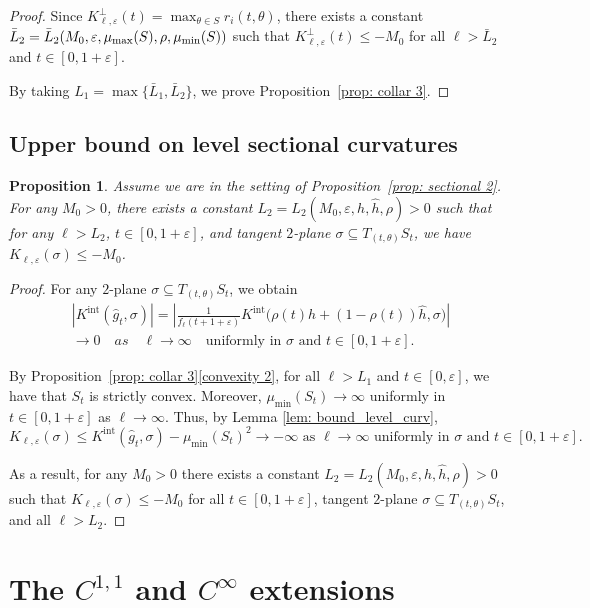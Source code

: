 \documentclass[10pt]{amsart}
\newcommand{\Int}{\mathrm{int}}
\newtheorem{proposition}[theorem]{Proposition}
\theoremstyle{definition}
\let\eps\varepsilon
\renewcommand{\>}{{\rangle}}
\newcommand{\<}{{\langle}}
\let\Subsection\subsection\let\Subsubsection\subsubsection
\begin{document}
\begin{proof}
Since $K^\perp_{\ell,\eps}(t)=\max_{\theta\in S} r_i(t,\theta)$, there exists a constant $\bar L_2=\bar L_2(M_0,\eps, \mu_{\max}(S), \rho,\\ \mu_{\min}(S))$ such that $K^\perp_{\ell,\eps}(t)\leq-M_0$ for all $\ell>\bar L_2$ and $t\in[0,1+\eps]$.

By taking $L_1 = \max\{\bar L_1, \bar L_2\}$, we prove Proposition~\ref{prop: collar 3}.
\end{proof}

\Subsection{Upper bound on level sectional curvatures}
\begin{proposition}\label{prop: level sectional 2}
Assume we are in the setting of Proposition~\ref{prop: sectional 2}. For any \hbox{$M_0\!>\!0$}, there exists a constant $L_2=L_2(M_0,\eps, h, \hat h, \rho)>0$ such that for any $\ell>L_2$, $t\in[0,1+\eps]$, and tangent $2$-plane $\sigma\subseteq T_{(t,\theta)}S_t$, we have $K_{\ell,\eps}(\sigma)\leq -M_0$.
\end{proposition}

\begin{proof}
For any $2$-plane $\sigma\subseteq T_{(t,\theta)}S_t$, we obtain
\begin{multline*}
|K^{\Int}(\hat g_t,\sigma)| = \left|\frac{1}{f_\ell(t+1+\eps)}K^{\Int}\bigl(\rho(t)h+(1-\rho(t))\hat h,\sigma\bigr)\right|\\
\to 0 \quad {as }\quad \ell\rightarrow\infty\quad \text{uniformly in $\sigma$ and $t\in[0,1+\eps]$.}
\end{multline*}

By Proposition~\ref{prop: collar 3}\eqref{convexity 2}, for all $\ell\!>\!L_1$ and $t\!\in\![0,\eps]$, we have that $S_t$ is strictly convex. Moreover, $\mu_{\min}(S_t)\to\infty$ uniformly in $t\in[0,1+\eps]$ as $\ell\to\infty$. Thus, by Lemma \ref{lem: bound_level_curv},
\[
K_{\ell,\eps}(\sigma)\leq K^{\Int}(\hat g_t, \sigma)-\mu_{\min}(S_t)^2\to -\infty \text{ as } \ell \rightarrow\infty \text{ uniformly in } \sigma \text{ and } t\in [0,1+\eps].
\]

As a result, for any $M_0>0$ there exists a constant $L_2=L_2(M_0,\eps, h, \hat h, \rho)>0$ such that $K_{\ell,\eps}(\sigma)\leq -M_0$ for all $t\in[0,1+\eps]$, tangent $2$-plane $\sigma\subseteq T_{(t,\theta)}S_t$, and all $\ell>L_2$.
\end{proof}

\section{The \texorpdfstring{$C^{1,1}$ and $C^{\infty}$}{C} extensions}\label{sec: metric_ext}
\end{document}
